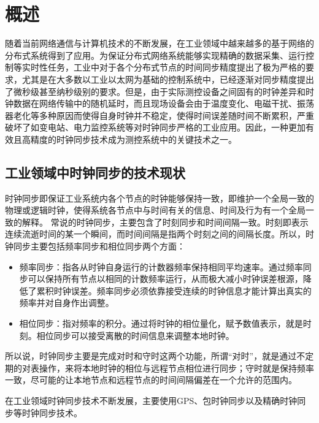 
\chapter{概述}
\label{chap:intro}
随着当前网络通信与计算机技术的不断发展，在工业领域中越来越多的基于网络的分布式系统得到了应用。为保证分布式网络系统能够实现精确的数据采集、运行控制等实时性任务，工业中对于各个分布式节点的时间同步精度提出了极为严格的要求，尤其是在大多数以工业以太网为基础的控制系统中，已经逐渐对同步精度提出了微秒级甚至纳秒级别的要求。但是，由于实际测控设备之间固有的时钟差异和时钟数据在网络传输中的随机延时，而且现场设备会由于温度变化、电磁干扰、振荡器老化等多种原因而使得自身时钟并不稳定，使得时间误差随时间不断累积，严重破坏了如变电站、电力监控系统等对时钟同步严格的工业应用。因此，一种更加有效且高精度的时钟同步技术成为测控系统中的关键技术之一。

\section{工业领域中时钟同步的技术现状}
时钟同步即保证工业系统内各个节点的时钟能够保持一致，即维护一个全局一致的物理或逻辑时钟，使得系统各节点中与时间有关的信息、时间及行为有一个全局一致的解释\supercite{1}。
常说的时钟同步，主要包含了时刻同步和时间间隔一致。时刻即表示连续流逝时间的某一个瞬间，而时间间隔是指两个时刻之间的间隔长度。所以，时钟同步主要包括频率同步和相位同步两个方面：
\begin{itemize}[noitemsep,topsep=0pt,parsep=0pt,partopsep=0pt]
	\item 频率同步：指各从时钟自身运行的计数器频率保持相同平均速率。通过频率同步可以保持所有节点以相同的计数频率运行，从而极大减小时钟误差根源，降低了累积时钟误差。频率同步必须依靠接受连续的时钟信息才能计算出真实的频率并对自身作出调整。
	\item 相位同步：指对频率的积分。通过将时钟的相位量化，赋予数值表示，就是时刻。相位同步可以接受离散的时间信息来调整本地时钟。
\end{itemize}
所以说，时钟同步主要是完成对时和守时这两个功能，所谓“对时”，就是通过不定期的对表操作，来将本地时钟的相位与远程节点相位进行同步；守时就是保持频率一致，尽可能的让本地节点和远程节点的时间间隔偏差在一个允许的范围内。

在工业领域时钟同步技术不断发展，主要使用GPS、包时钟同步以及精确时钟同步等时钟同步技术。

